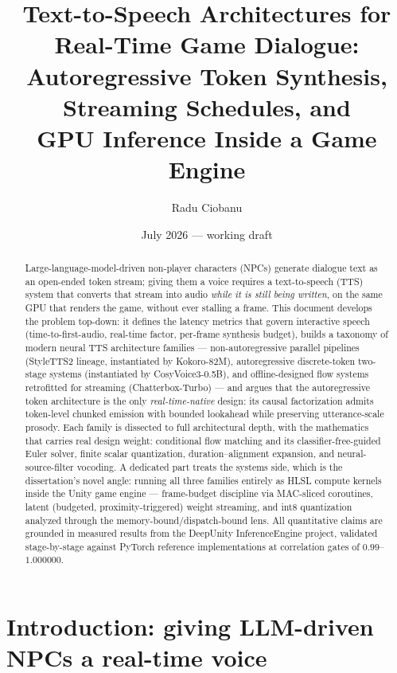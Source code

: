 \documentclass[11pt,a4paper]{article}
\title{\textbf{Text-to-Speech Architectures for Real-Time Game Dialogue:}\\
\Large Autoregressive Token Synthesis, Streaming Schedules, and\\
GPU Inference Inside a Game Engine}
\author{Radu Ciobanu}
\date{July 2026 --- working draft}
\begin{document}
\maketitle

\begin{abstract}
\noindent
Large-language-model-driven non-player characters (NPCs) generate dialogue text as an
open-ended token stream; giving them a voice requires a text-to-speech (TTS) system that
converts that stream into audio \emph{while it is still being written}, on the same GPU
that renders the game, without ever stalling a frame. This document develops the problem
top-down: it defines the latency metrics that govern interactive speech
(time-to-first-audio, real-time factor, per-frame synthesis budget), builds a taxonomy of
modern neural TTS architecture families --- non-autoregressive parallel pipelines
(StyleTTS2 lineage, instantiated by Kokoro-82M), autoregressive discrete-token two-stage
systems (instantiated by CosyVoice3-0.5B), and offline-designed flow systems retrofitted
for streaming (Chatterbox-Turbo) --- and argues that the autoregressive token
architecture is the only \emph{real-time-native} design: its causal factorization admits
token-level chunked emission with bounded lookahead while preserving utterance-scale
prosody. Each family is dissected to full architectural depth, with the mathematics that
carries real design weight: conditional flow matching and its classifier-free-guided
Euler solver, finite scalar quantization, duration--alignment expansion, and
neural-source-filter vocoding. A dedicated part treats the systems side, which is the
dissertation's novel angle: running all three families entirely as HLSL compute kernels
inside the Unity game engine --- frame-budget discipline via MAC-sliced coroutines,
latent (budgeted, proximity-triggered) weight streaming, and int8 quantization analyzed
through the memory-bound/dispatch-bound lens. All quantitative claims are grounded in
measured results from the DeepUnity InferenceEngine project, validated stage-by-stage
against PyTorch reference implementations at correlation gates of $0.99$--$1.000000$.
\end{abstract}

\tableofcontents
\newpage

\section{Introduction: giving LLM-driven NPCs a real-time voice}
\label{sec:intro}
\end{document}
